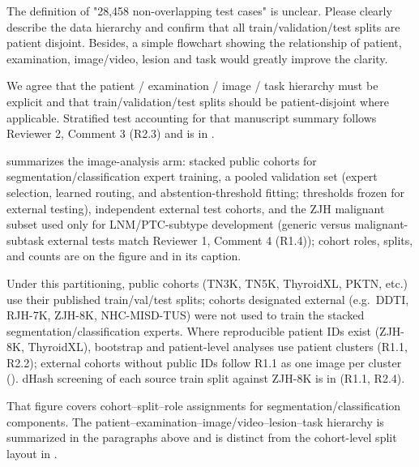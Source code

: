 \begin{reviewercomment}
The definition of "28,458 non-overlapping test cases" is unclear. Please clearly describe the data hierarchy and confirm that all train/validation/test splits are patient disjoint. Besides, a simple flowchart showing the relationship of patient, examination, image/video, lesion and task would greatly improve the clarity.
\end{reviewercomment}
\begin{authorresponse}
We agree that the patient / examination / image / task hierarchy must be explicit and that train/validation/test splits should be patient-disjoint where applicable. Stratified test accounting for that manuscript summary follows Reviewer 2, Comment 3 (R2.3) and is in .\par
{} summarizes the image-analysis arm: stacked public cohorts for segmentation/classification expert training, a pooled validation set (expert selection, learned routing, and abstention-threshold fitting; thresholds frozen for external testing), independent external test cohorts, and the ZJH malignant subset used only for LNM/PTC-subtype development (generic versus malignant-subtask external tests match Reviewer 1, Comment 4 (R1.4)); cohort roles, splits, and counts are on the figure and in its caption.\par
Under this partitioning, public cohorts (TN3K, TN5K, ThyroidXL, PKTN, etc.) use their published train/val/test splits; cohorts designated external (e.g.\ DDTI, RJH-7K, ZJH-8K, NHC-MISD-TUS) were not used to train the stacked segmentation/classification experts. Where reproducible patient IDs exist (ZJH-8K, ThyroidXL), bootstrap and patient-level analyses use patient clusters (R1.1, R2.2); external cohorts without public IDs follow R1.1 as one image per cluster (). dHash screening of each source train split against ZJH-8K is in  (R1.1, R2.4).\par
That figure covers cohort--split--role assignments for segmentation/classification components. The patient--examination--image/video--lesion--task hierarchy is summarized in the paragraphs above and is distinct from the cohort-level split layout in .\par
\par
\end{authorresponse}

